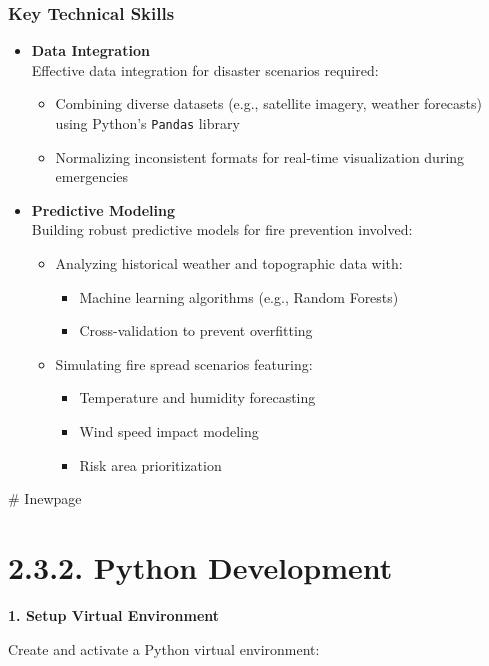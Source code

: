 \documentclass[a4paper, 11pt]{report}
\begin{document}
\subsubsection*{Key Technical Skills}
\begin{itemize}
    \item \textbf{Data Integration} \\
    Effective data integration for disaster scenarios required:
    \begin{itemize}
        \item Combining diverse datasets (e.g., satellite imagery, weather forecasts) using Python’s \texttt{Pandas} library
        \item Normalizing inconsistent formats for real-time visualization during emergencies
    \end{itemize}

    \item \textbf{Predictive Modeling} \\
    Building robust predictive models for fire prevention involved:
    \begin{itemize}
        \item Analyzing historical weather and topographic data with:
        \begin{itemize}
            \item Machine learning algorithms (e.g., Random Forests)
            \item Cross-validation to prevent overfitting
        \end{itemize}
        \item Simulating fire spread scenarios featuring:
        \begin{itemize}
            \item Temperature and humidity forecasting
            \item Wind speed impact modeling
            \item Risk area prioritization
        \end{itemize}
    \end{itemize}
\end{itemize}
\newpage
# Inewpage

\section*{2.3.2. Python Development}

\textbf{1. Setup Virtual Environment}

Create and activate a Python virtual environment:
\end{document}
